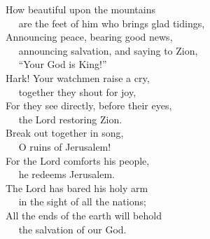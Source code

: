 
\lettrine{H}{}ow beautiful upon the mountains\\
   are the feet of him who brings glad tidings,\\
Announcing peace, bearing good news,\\
   announcing salvation, and saying to Zion,\\
   “Your God is King!”\\
Hark! Your watchmen raise a cry,\\
   together they shout for joy,\\
For they see directly, before their eyes,\\
   the Lord restoring Zion.\\
Break out together in song,\\
   O ruins of Jerusalem!\\
For the Lord comforts his people,\\
   he redeems Jerusalem.\\
The Lord has bared his holy arm\\
   in the sight of all the nations;\\
All the ends of the earth will behold\\
   the salvation of our God.